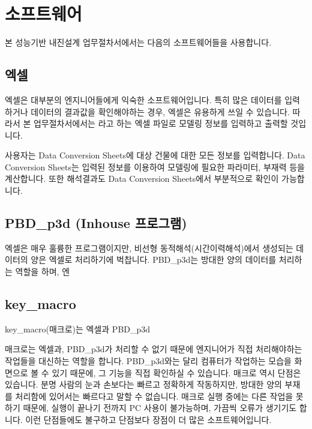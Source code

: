 \documentclass[a4paper,11pt,korean,openany,oneside]{sphinxmanual}
\begin{document}
\section{소프트웨어}
\label{\detokenize{0_intro_latex:id8}}
\sphinxAtStartPar
본 성능기반 내진설계 업무절차서에서는 다음의 소프트웨어들을 사용합니다.


\subsection{엑셀}
\label{\detokenize{0_intro_latex:id9}}
\sphinxAtStartPar
엑셀은 대부분의 엔지니어들에게 익숙한 소프트웨어입니다.
특히 많은 데이터를 입력하거나 데이터의 결과값을 확인해야하는 경우, 엑셀은 유용하게 쓰일 수 있습니다.
따라서 본 업무절차서에서는 라고 하는 엑셀 파일로 모델링 정보를 입력하고 출력할 것입니다.

\sphinxAtStartPar
사용자는 Data Conversion Sheets에 대상 건물에 대한 모든 정보를 입력합니다.
Data Conversion Sheets는 입력된 정보를 이용하여 모델링에 필요한 파라미터, 부재력 등을 계산합니다.
또한 해석결과도 Data Conversion Sheets에서 부분적으로 확인이 가능합니다.


\subsection{PBD\_p3d (In\sphinxhyphen{}house 프로그램)}
\label{\detokenize{0_intro_latex:pbd-p3d-in-house}}
\sphinxAtStartPar
엑셀은 매우 훌륭한 프로그램이지만, 비선형 동적해석(시간이력해석)에서 생성되는 데이터의 양은 엑셀로 처리하기에 벅찹니다.
PBD\_p3d는 방대한 양의 데이터를 처리하는 역할을 하며, 엔


\subsection{key\_macro}
\label{\detokenize{0_intro_latex:key-macro}}
\sphinxAtStartPar
key\_macro(매크로)는 엑셀과 PBD\_p3d

\sphinxAtStartPar
매크로는 엑셀과, PBD\_p3d가 처리할 수 없기 때문에 엔지니어가 직접 처리해야하는 작업들을 대신하는 역할을 합니다.
PBD\_p3d와는 달리 컴퓨터가 작업하는 모습을 화면으로 볼 수 있기 때문에, 그 기능을 직접 확인하실 수 있습니다.
매크로 역시 단점은 있습니다. 분명 사람의 눈과 손보다는 빠르고 정확하게 작동하지만, 방대한 양의 부재를 처리함에 있어서는 빠르다고 말할 수 없습니다.
매크로 실행 중에는 다른 작업을 못하기 때문에, 실행이 끝나기 전까지 PC 사용이 불가능하며, 가끔씩 오류가 생기기도 합니다.
이런 단점들에도 불구하고 단점보다 장점이 더 많은 소프트웨어입니다.
\end{document}
